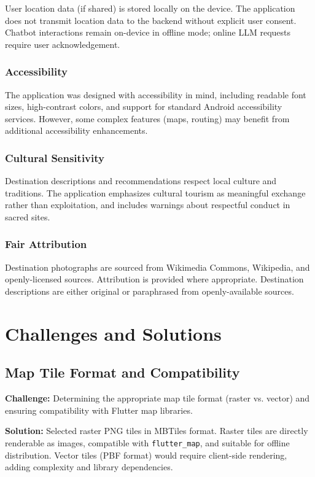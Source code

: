 \documentclass[12pt,a4paper,oneside]{report}
\begin{document}
User location data (if shared) is stored locally on the device. The application does not transmit location data to the backend without explicit user consent. Chatbot interactions remain on-device in offline mode; online LLM requests require user acknowledgement.

\subsection{Accessibility}

The application was designed with accessibility in mind, including readable font sizes, high-contrast colors, and support for standard Android accessibility services. However, some complex features (maps, routing) may benefit from additional accessibility enhancements.

\subsection{Cultural Sensitivity}

Destination descriptions and recommendations respect local culture and traditions. The application emphasizes cultural tourism as meaningful exchange rather than exploitation, and includes warnings about respectful conduct in sacred sites.

\subsection{Fair Attribution}

Destination photographs are sourced from Wikimedia Commons, Wikipedia, and openly-licensed sources. Attribution is provided where appropriate. Destination descriptions are either original or paraphrased from openly-available sources.
\chapter{Challenges and Solutions}
\label{ch:challenges}

\section{Map Tile Format and Compatibility}
\label{sec:ch_tiles}

\textbf{Challenge:} Determining the appropriate map tile format (raster vs. vector) and ensuring compatibility with Flutter map libraries.

\textbf{Solution:} Selected raster PNG tiles in MBTiles format. Raster tiles are directly renderable as images, compatible with \texttt{flutter\_map}, and suitable for offline distribution. Vector tiles (PBF format) would require client-side rendering, adding complexity and library dependencies.
\end{document}
